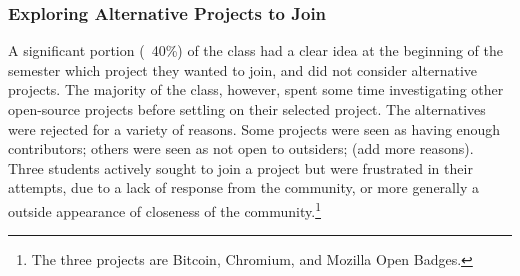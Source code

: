 \subsubsection{Exploring Alternative Projects to Join}

A significant portion (~40\%) of the class had a clear idea at the beginning of the semester which project they wanted to join, and did not consider alternative projects. The majority of the class, however, spent some time investigating other open-source projects before settling on their selected project. The alternatives were rejected for a variety of reasons. Some projects were seen as having enough contributors; others were seen as not open to outsiders; {\bold (add more reasons)}. Three students actively sought to join a project but were frustrated in their attempts, due to a lack of response from the community, or more generally a outside appearance of {\italic closeness} of the community.\footnote{The three projects are Bitcoin, Chromium, and Mozilla Open Badges.}
